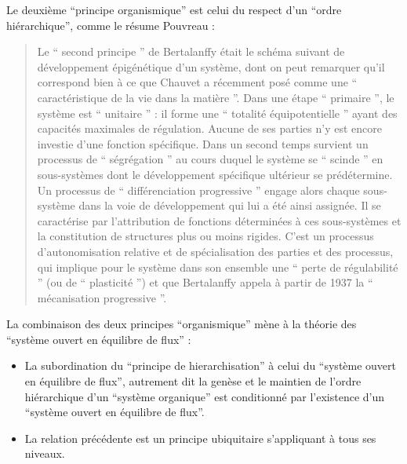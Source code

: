 Le deuxième \enquote{principe organismique} est celui du respect d'un \enquote{ordre hiérarchique}, comme le résume Pouvreau : 

\blockquote[{\cite[476-477]{Pouvreau2013}}]{Le \enquote{ second principe } de Bertalanffy était le schéma suivant de développement épigénétique d’un système, dont on peut remarquer qu’il correspond bien à ce que Chauvet a récemment posé comme une \enquote{ caractéristique de la vie dans la matière }. Dans une étape \enquote{ primaire }, le système est \enquote{ unitaire } : il forme une \enquote{ totalité équipotentielle } ayant des capacités maximales de régulation. Aucune de ses parties n’y est encore investie d’une fonction spécifique. Dans un second temps survient un processus de \enquote{ ségrégation } au cours duquel le système se \enquote{ scinde } en sous-systèmes dont le développement spécifique ultérieur se prédétermine. Un processus de \enquote{ différenciation progressive } engage alors chaque sous-système dans la voie de développement qui lui a été ainsi assignée. Il se caractérise par l’attribution de fonctions déterminées à ces sous-systèmes et la constitution de structures plus ou moins rigides. C’est un processus d’autonomisation relative et de spécialisation des parties et des processus, qui implique pour le système dans son ensemble une \enquote{ perte de régulabilité } (ou de \enquote{ plasticité }) et que Bertalanffy appela à partir de 1937 la \enquote{ mécanisation progressive }.}



La combinaison des deux principes \enquote{organismique} mène à la théorie des \enquote{système ouvert en équilibre de flux} \autocite[481]{Pouvreau2013}:
\begin{itemize}
\item La subordination du \enquote{principe de hierarchisation} à celui du \enquote{système ouvert en équilibre de flux}, autrement dit la genèse et le maintien de l’ordre hiérarchique d’un \enquote{système organique} est conditionné par l'existence d'un \enquote{système ouvert en équilibre de flux}.
\item  La relation précédente est un principe ubiquitaire s’appliquant à tous ses niveaux.
\end{itemize}

